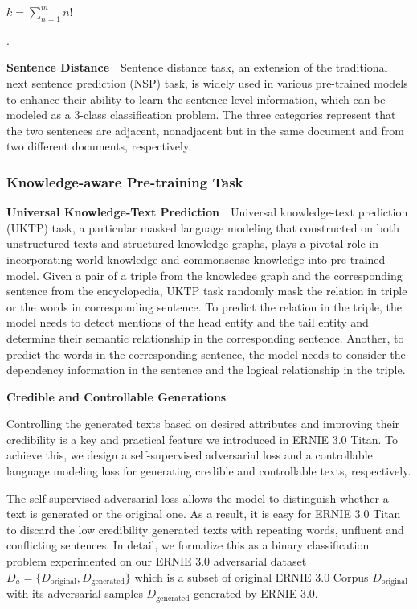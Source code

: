 \begin{math} k=\sum_{n=1}^{m} n!\end{math}

.

\textbf{Sentence Distance} \,\, 
Sentence distance task, an extension of the traditional next sentence prediction (NSP) task, is widely used in various pre-trained models to enhance their ability to learn the sentence-level information, which can be modeled as a 3-class classification problem. The three categories represent that the two sentences are adjacent, nonadjacent but in the same document and from two different documents, respectively.

\subsubsection{Knowledge-aware Pre-training Task}\label{sec: pretrain-task}
\textbf{Universal Knowledge-Text Prediction} \,\,
Universal knowledge-text prediction (UKTP) task, a particular masked language modeling that constructed on both unstructured texts and structured knowledge graphs, plays a pivotal role in incorporating world knowledge and commonsense knowledge into pre-trained model. Given a pair of a triple from the knowledge graph and the corresponding sentence from the encyclopedia, UKTP task randomly mask the relation in triple or the words in corresponding sentence. To predict the relation in the triple, the model needs to detect mentions of the head entity and the tail entity and determine their semantic relationship in the corresponding sentence. Another, to predict the words in the corresponding sentence, the model needs to consider the dependency information in the sentence and the logical relationship in the triple.

\textbf{Credible and Controllable Generations} \,\, 

Controlling the generated texts based on desired attributes and improving their credibility is a key and practical feature we introduced in ERNIE 3.0 Titan. To achieve this, we design a self-supervised adversarial loss and a controllable language modeling loss for generating credible and controllable texts, respectively. 

The self-supervised adversarial loss allows the model to distinguish whether a text is generated or the original one. As a result, it is easy for ERNIE 3.0 Titan to discard the low credibility generated texts with repeating words, unfluent and conflicting sentences. In detail, we formalize this as a binary classification problem experimented on our ERNIE 3.0 adversarial dataset $D_{a} = \{D_{\text{original}}, D_{\text{generated}}\}$ which is a subset of original ERNIE 3.0 Corpus ${D_{\text{original}}}$ with its adversarial samples $D_{\text{generated}}$ generated by ERNIE 3.0.

